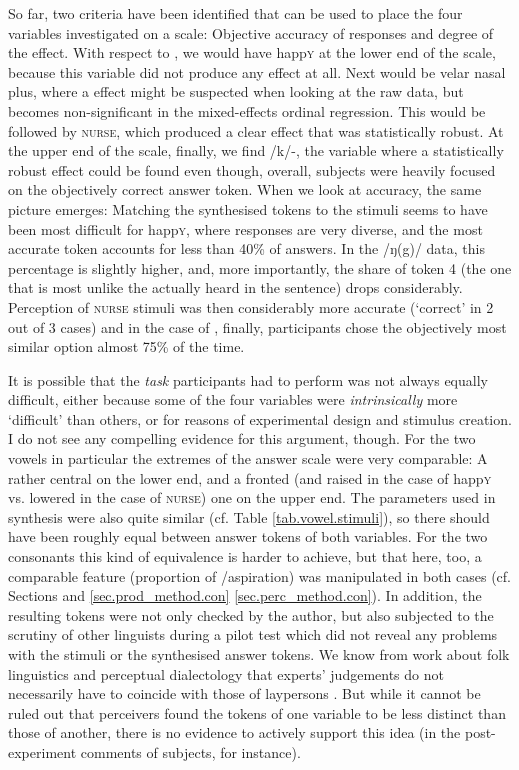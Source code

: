 So far, two criteria have been identified that can be used to place the four variables investigated on a scale: Objective accuracy of responses and degree of the  effect.
With respect to , we would have happ\textsc{y} at the lower end of the scale, because this variable did not produce any  effect at all.
Next would be velar nasal plus, where a  effect might be suspected when looking at the raw data, but becomes non-significant in the mixed-effects ordinal regression.
This would be followed by \textsc{nurse}, which produced a clear  effect that was statistically robust.
At the upper end of the scale, finally, we find /k/-, the variable where a statistically robust  effect could be found even though, overall, subjects were heavily focused on the objectively correct answer token.
When we look at accuracy, the same picture emerges:
Matching the synthesised tokens to the stimuli seems to have been most difficult for happ\textsc{y}, where responses are very diverse, and the most accurate token accounts for less than 40\% of answers.
In the /ŋ(g)/ data, this percentage is slightly higher, and, more importantly, the share of token 4 (the one that is most unlike the  actually heard in the sentence) drops considerably.
Perception of \textsc{nurse} stimuli was then considerably more accurate (`correct'  in 2 out of 3 cases) and in the case of , finally, participants chose the objectively most similar option almost 75\% of the time.

It is possible that the \emph{task} participants had to perform was not always equally difficult, either because some of the four variables were \emph{intrinsically} more `difficult' than others, or for reasons of experimental design and stimulus creation.
I do not see any compelling evidence for this argument, though.
For the two vowels in particular the extremes of the answer scale were very comparable: A rather central  on the lower end, and a fronted (and raised in the case of happ\textsc{y} vs. lowered in the case of \textsc{nurse)} one on the upper end.
The parameters used in synthesis were also quite similar (cf. Table \ref{tab.vowel.stimuli}), so there should have been roughly equal  between answer tokens of both variables.
For the two consonants this kind of equivalence is harder to achieve, but  that here, too, a comparable feature (proportion of /aspiration) was manipulated in both cases (cf. Sections and \ref{sec.prod_method.con} \ref{sec.perc_method.con}).
In addition, the resulting tokens were not only checked  by the author, but also subjected to the scrutiny of other linguists during a pilot test which did not reveal any problems with the stimuli or the synthesised answer tokens.
We know from work about folk linguistics and perceptual dialectology that experts' judgements do not necessarily have to coincide with those of laypersons \parencite{preston1999,niedzielskipreston2000}.
But while it cannot be ruled out that perceivers found the tokens of one variable to be less distinct than those of another, there is no evidence to actively support this idea (in the post-experiment comments of subjects, for instance). 

